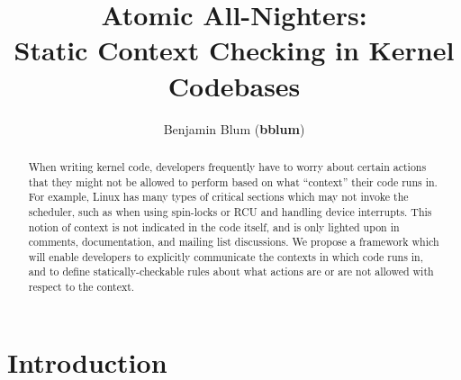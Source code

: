 \documentclass{article}
\begin{document}
\captionsetup{width=.75\textwidth,font=small,labelfont=bf}
\title{\bf Atomic All-Nighters: \\ Static Context Checking in Kernel Codebases}
\author{Benjamin Blum (\textbf{bblum})}
\maketitle

\newcommand\true{\;\textit{true}}
\newcommand\false{\;\textit{false}}

\newcommand\alpher\alpha
\newcommand\beter\beta
\newcommand\gammer\gamma
\newcommand\delter\delta
\newcommand\zeter\zeta
\newcommand\Sigmer\Sigma

\newcommand\NN{\mathbb{N}}
\newcommand\QQ{\mathbb{Q}}
\newcommand\RR{\mathbb{R}}
\newcommand\ZZ{\mathbb{Z}}

\newcommand\Infinity{ {\sf Infinity}}
\newcommand{\Nested}[1]{ {\sf Nested}~ #1}
\newcommand{\IncDec}[1]{ {\sf IncDec}~ #1}
\newcommand\Enable{ {\sf Enable}}
\newcommand\Disable{ {\sf Disable}}
\newcommand\inc{ {\sf inc}}
\newcommand\dec{ {\sf dec}}

\begin{abstract}
When writing kernel code, developers frequently have to worry about certain actions that they might not be allowed to perform based on what ``context'' their code runs in.
For example, Linux has many types of critical sections which may not invoke the scheduler, such as when using spin-locks or RCU and handling device interrupts.
This notion of context is not indicated in the code itself, and is only lighted upon in comments, documentation, and mailing list discussions.
We propose a framework which will enable developers to explicitly communicate the contexts in which code runs in, and to define statically-checkable rules about what actions are or are not allowed with respect to the context.
\end{abstract}

\section{Introduction}
\end{document}
